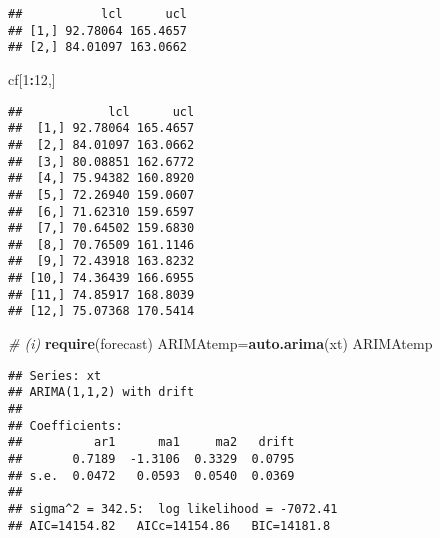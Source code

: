 \documentclass[
]{article}
\newenvironment{Shaded}{\begin{snugshade}}{\end{snugshade}}
\newcommand{\CommentTok}[1]{\textcolor[rgb]{0.56,0.35,0.01}{\textit{#1}}}
\newcommand{\DecValTok}[1]{\textcolor[rgb]{0.00,0.00,0.81}{#1}}
\newcommand{\FloatTok}[1]{\textcolor[rgb]{0.00,0.00,0.81}{#1}}
\newcommand{\FunctionTok}[1]{\textcolor[rgb]{0.13,0.29,0.53}{\textbf{#1}}}
\newcommand{\NormalTok}[1]{#1}
\newcommand{\OtherTok}[1]{\textcolor[rgb]{0.56,0.35,0.01}{#1}}
\newcommand{\SpecialCharTok}[1]{\textcolor[rgb]{0.81,0.36,0.00}{\textbf{#1}}}
\begin{document}
\begin{Shaded}
\end{Shaded}

\begin{verbatim}
##           lcl      ucl
## [1,] 92.78064 165.4657
## [2,] 84.01097 163.0662
\end{verbatim}

\begin{Shaded}
\begin{Highlighting}[]
\NormalTok{cf[}\DecValTok{1}\SpecialCharTok{:}\DecValTok{12}\NormalTok{,]}
\end{Highlighting}
\end{Shaded}

\begin{verbatim}
##            lcl      ucl
##  [1,] 92.78064 165.4657
##  [2,] 84.01097 163.0662
##  [3,] 80.08851 162.6772
##  [4,] 75.94382 160.8920
##  [5,] 72.26940 159.0607
##  [6,] 71.62310 159.6597
##  [7,] 70.64502 159.6830
##  [8,] 70.76509 161.1146
##  [9,] 72.43918 163.8232
## [10,] 74.36439 166.6955
## [11,] 74.85917 168.8039
## [12,] 75.07368 170.5414
\end{verbatim}

\begin{Shaded}
\begin{Highlighting}[]
\CommentTok{\# (i)}
\FunctionTok{require}\NormalTok{(forecast)}
\NormalTok{ARIMAtemp}\OtherTok{=}\FunctionTok{auto.arima}\NormalTok{(xt)}
\NormalTok{ARIMAtemp}
\end{Highlighting}
\end{Shaded}

\begin{verbatim}
## Series: xt 
## ARIMA(1,1,2) with drift 
## 
## Coefficients:
##          ar1      ma1     ma2   drift
##       0.7189  -1.3106  0.3329  0.0795
## s.e.  0.0472   0.0593  0.0540  0.0369
## 
## sigma^2 = 342.5:  log likelihood = -7072.41
## AIC=14154.82   AICc=14154.86   BIC=14181.8
\end{verbatim}
\end{document}
